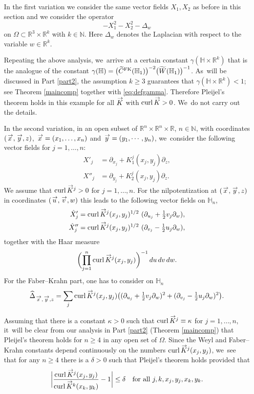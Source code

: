 \documentclass[JEP,XML,SOM,Unicode,published]{cedram}
\newcommand{\FK}{\textup{FK}}
\DeclareMathOperator{\curl}{curl}
\renewcommand{\vec}[1]
{\overset{\,{\raisebox{-2pt}{$\scriptstyle\to$}}}{#1}}
\theoremstyle{definition}
\newcommand{\1}{\mathbbm{1}}
\newcommand{\N}{\mathbb{N}}
\newcommand{\R}{\mathbb{R}}
\begin{document}
In the first variation we consider the same vector fields $X_1,X_2$ as before in this section and we consider the operator
\[
-X_1^2 - X_2^2 -\Delta_w
\]
on $\Omega \subset \R^3 \times \mathbb R^k$ with $k\in\N$. Here $\Delta_w$ denotes the Laplacian with respect to the variable $w\in\R^k$.

Repeating the above analysis, we~arrive at a certain constant $\gamma (\mathbb H \times \mathbb R^k)$ that is the analogue of the constant $\gamma (\mathbb H) = \bigl(\widetilde C^\FK(\mathbb H_1)\bigr)^{-2} \bigl(\widetilde W (\mathbb H_1)\bigr)^{-1}$. As~will be discussed in Part \ref{part2}, the assumption $k\geq 3$ guarantees that $\gamma (\mathbb H \times \mathbb R^k)<1$; see Theorem \ref{maincomp} together with \eqref{eq:defgamma}. Therefore Pleijel's theorem holds in this example for all $\vec K$ with $\curl\vec K>0$. We~do not carry out the details.

In the second variation, in an open subset of $\R^n\times\R^n\times\R$, $n\in\mathbb N$, with coordinates $(\vec x,\vec y,z)$, $\vec x =(x_1,\dots,x_n)$ and $\vec y=(y_1,\cdots, y_n)$, we~consider the following vector fields for $j=1,\ldots, n$:
\begin{align*}
X'_j&= \partial_{x_j} + K_1^j (x_j,y_j) \partial_z,\\
X''_j& = \partial_{y_j} + K_2^j (x_j,y_j) \partial_z.
\end{align*}
We assume that $\curl \vec K{}^j >0$ for $j=1,\ldots, n$.
For the nilpotentization at $(\vec x,\vec y,z)$ in coordinates $(\vec u,\vec v,w)$ this leads to the following vector fields on $\mathbb H_n$,
\begin{align*}
\hat X'_j & = \curl\vec K{}^j(x_j,y_j)^{1/2} \ (\partial _{u_j} +\tfrac 12 v_j \partial_w),\\
\hat X''_j& = \curl\vec K{}^j(x_j,y_j)^{1/2} \ (\partial _{v_j} - \tfrac 12 u_j \partial_w),
\end{align*}
together with the Haar measure
\[
\biggl(\prod_{j=1}^n \curl \vec K{}^j(x_j,y_j) \biggr)^{-1} \,du\,dv\,dw.
\]
For the Faber--Krahn part, one has to consider on $\mathbb H_n$
\[
\widehat \Delta_{\vec x,\vec y,z}= \sum_j \curl \vec K{}^j(x_j,y_j) \bigl((\partial _{u_j} + \tfrac{ 1}{2} v_j \partial_w)^2+(\partial _{v_j} - \tfrac {1}{2}u_j\partial_w)^2 \bigr).
\]

Assuming that there is a constant $\kappa>0$ such that $\curl \vec K{}^j \equiv \kappa$ for $j=1,\ldots,n$, it~will be clear from our analysis in Part \ref{part2} (Theorem \ref{maincomp}) that Pleijel's theorem holds for $n\geq 4$ in any open set of $\Omega$. Since the Weyl and Faber--Krahn constants depend continuously on the numbers $\curl \vec K{}^j(x_j,y_j)$, we~see that for any $n\geq 4$ there is a $\delta>0$ such that Pleijel's theorem holds provided that
\[
\biggl| \frac{\curl \vec K{}^j(x_j,y_j)}{\curl \vec K{}^k(x_k,y_k)} - 1\biggr| \leq \delta
\quad\text{for all}\ j, k, x_j,y_j, x_k,y_k.
\]
\end{document}

